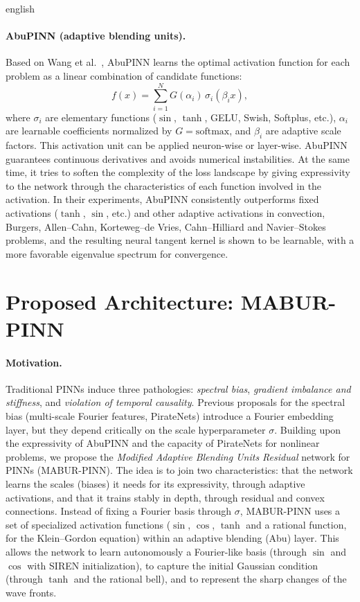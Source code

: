 \documentclass[0000.tex]{subfiles}
\begin{document}
\begin{hyphenrules}{english}
\paragraph{AbuPINN (adaptive blending units).}
Based on Wang et al.~\cite{wang2023abu}, AbuPINN learns the optimal activation function for each problem as a
linear combination of candidate functions:
\begin{equation}
  f(x)=\sum_{i=1}^{N}G(\alpha_i)\,\sigma_i(\beta_ix),
  \label{eq:abu}
\end{equation}
where $\sigma_i$ are elementary functions ($\sin$, $\tanh$, GELU, Swish, Softplus, etc.), $\alpha_i$ are
learnable coefficients normalized by $G=\mathrm{softmax}$, and $\beta_i$ are adaptive scale factors. This
activation unit can be applied neuron-wise or layer-wise. AbuPINN guarantees continuous derivatives and
avoids numerical instabilities. At the same time, it tries to soften the complexity of the loss landscape
by giving expressivity to the network through the characteristics of each function involved in the
activation. In their experiments, AbuPINN consistently outperforms fixed activations ($\tanh$, $\sin$,
etc.) and other adaptive activations in convection, Burgers, Allen--Cahn, Korteweg--de Vries,
Cahn--Hilliard and Navier--Stokes problems, and the resulting neural tangent kernel is shown to be
learnable, with a more favorable eigenvalue spectrum for convergence.

\section{Proposed Architecture: MABUR-PINN}\label{sec:mabur}

\paragraph{Motivation.}
Traditional PINNs induce three pathologies: \emph{spectral bias}, \emph{gradient imbalance and
stiffness}, and \emph{violation of temporal causality}. Previous proposals for the spectral bias
(multi-scale Fourier features, PirateNets) introduce a Fourier embedding layer, but they depend critically
on the scale hyperparameter $\sigma$. Building upon the expressivity of AbuPINN and the capacity of
PirateNets for nonlinear problems, we propose the \emph{Modified Adaptive Blending Units Residual} network
for PINNs (MABUR-PINN). The idea is to join two characteristics: that the network learns the scales
(biases) it needs for its expressivity, through adaptive activations, and that it trains stably in depth,
through residual and convex connections. Instead of fixing a Fourier basis through $\sigma$, MABUR-PINN
uses a set of specialized activation functions ($\sin$, $\cos$, $\tanh$ and a rational function, for the
Klein--Gordon equation) within an adaptive blending (Abu) layer. This allows the network to learn
autonomously a Fourier-like basis (through $\sin$ and $\cos$ with SIREN initialization), to capture the
initial Gaussian condition (through $\tanh$ and the rational bell), and to represent the sharp changes of
the wave fronts.


\end{hyphenrules}
\end{document}
